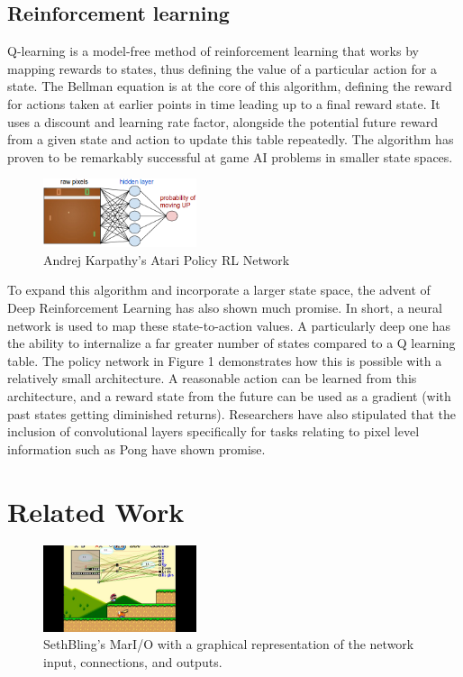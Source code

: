 \documentclass[conference]{IEEEtran}
\begin{document}
\subsection{Reinforcement learning}

Q-learning is a model-free method of reinforcement learning that works by mapping rewards to states, thus defining the value of a particular action for a state. The Bellman equation is at the core of this algorithm, defining the reward for actions taken at earlier points in time leading up to a final reward state. It uses a discount and learning rate factor, alongside the potential future reward from a given state and action to update this table repeatedly. The algorithm has proven to be remarkably successful at game AI problems in smaller state spaces. 

\begin{figure}[htbp]
    \centerline{\includegraphics[width=0.4\textwidth]{policy.png}}
    \caption{Andrej Karpathy's Atari Policy RL Network}
    \label{andrejkarpathy}
\end{figure}

To expand this algorithm and incorporate a larger state space, the advent of Deep Reinforcement Learning has also shown much promise. In short, a neural network is used to map these state-to-action values. A particularly deep one has the ability to internalize a far greater number of states compared to a Q learning table. The policy network in Figure 1 demonstrates how this is possible with a relatively small architecture. A reasonable action can be learned from this architecture, and a reward state from the future can be used as a gradient (with past states getting diminished returns). Researchers have also stipulated that the inclusion of convolutional layers specifically for tasks relating to pixel level information such as Pong have shown promise.

\section{Related Work}

\begin{figure}[htbp]
\centerline{\includegraphics[width=0.4\textwidth]{sethbling.jpg}}
\caption{SethBling's MarI/O with a graphical representation of the network input, connections, and outputs.}
\label{sethbling}
\end{figure}
\end{document}
